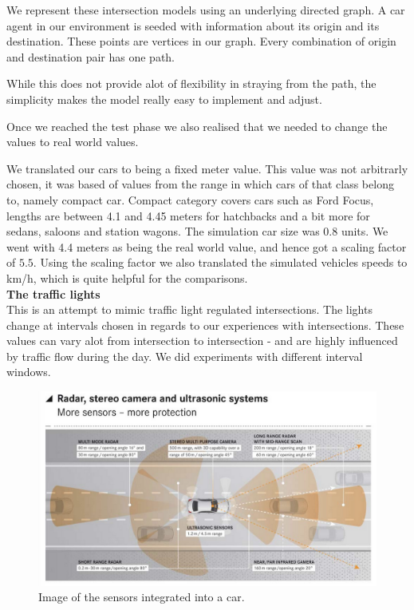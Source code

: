 
We represent these intersection models using an underlying directed graph.
 A car agent in our environment is seeded with information about its origin and its destination.
These points are vertices in our graph. 
Every combination of origin and destination pair has one path.

While this does not provide alot of flexibility in straying from the path, the simplicity makes the model really easy to implement and adjust.

Once we reached the test phase we also realised that we needed to change the values to real world values.

We translated our cars to being a fixed meter value. This value was not arbitrarly chosen, it was based of values from the range in which cars of that class belong to, namely compact car.
Compact category covers cars such as Ford Focus, lengths are between 4.1 and 4.45 meters for hatchbacks and a bit more for sedans, saloons and station wagons.
The simulation car size was 0.8 units. We went with 4.4 meters as being the real world value, and hence got a scaling factor of $5.5$.
Using the scaling factor we also translated the simulated vehicles speeds to km/h, which is quite helpful for the comparisons.\\

\noindent
\textbf{The traffic lights}\\
This is an attempt to mimic traffic light regulated intersections.
The lights change at intervals chosen in regards to our experiences with intersections. 
These values can vary alot from intersection to intersection - and are highly influenced by traffic flow during the day. 
We did experiments with different interval windows.

\begin{figure}
\centering
\includegraphics[scale=.2]{img/tesla_sensor}
\caption{Image of the sensors integrated into a car.}
\label{figure:tesla_sens}
\end{figure}

